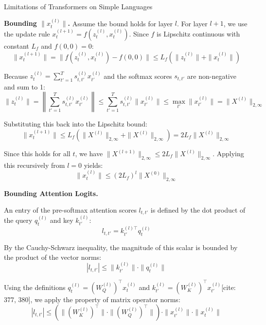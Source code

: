 \begin{question}{Limitations of Transformers on Simple Languages}
\begin{subquestion}{\textbf{Bounding $\|x_{t}^{(l)}\|$.}}
    Assume the bound holds for layer $l$. For layer $l+1$, we use the update rule $x_t^{(l+1)} = f(z_t^{(l)}, x_t^{(l)})$. Since $f$ is Lipschitz continuous with constant $L_f$ and $f(0,0)=0$:
    \begin{equation}
    \|x_t^{(l+1)}\| = \|f(z_t^{(l)}, x_t^{(l)}) - f(0,0)\| \le L_f (\|z_t^{(l)}\| + \|x_t^{(l)}\|)
    \end{equation}

    Because $z_t^{(l)} = \sum_{t'=1}^{T} s_{t,t'}^{(l)} x_{t'}^{(l)}$ and the softmax scores $s_{t,t'}$ are non-negative and sum to 1:
    \begin{equation}
    \|z_t^{(l)}\| = \left\| \sum_{t'=1}^{T} s_{t,t'}^{(l)} x_{t'}^{(l)} \right\| \le \sum_{t'=1}^{T} s_{t,t'}^{(l)} \|x_{t'}^{(l)}\| \le \max_{t'} \|x_{t'}^{(l)}\| = \|X^{(l)}\|_{2,\infty}
    \end{equation}

    Substituting this back into the Lipschitz bound:
    \begin{equation}
    \|x_t^{(l+1)}\| \le L_f (\|X^{(l)}\|_{2,\infty} + \|X^{(l)}\|_{2,\infty}) = 2L_f \|X^{(l)}\|_{2,\infty}
    \end{equation}

    Since this holds for all $t$, we have $\|X^{(l+1)}\|_{2,\infty} \le 2L_f \|X^{(l)}\|_{2,\infty}$. Applying this recursively from $l=0$ yields:
    \begin{equation}
    \|x_t^{(l)}\| \le (2L_f)^l \|X^{(0)}\|_{2,\infty}
    \end{equation}

\end{subquestion}

\begin{subquestion}{\textbf{Bounding Attention Logits.}}

    An entry of the pre-softmax attention scores $l_{t, t'}$ is defined by the dot product of the query $q_t^{(l)}$ and key $k_{t'}^{(l)}$:
    \begin{equation}
    l_{t, t'} = k_{t'}^{(l)\top} q_t^{(l)}
    \end{equation}

    By the Cauchy-Schwarz inequality, the magnitude of this scalar is bounded by the product of the vector norms:
    \begin{equation}
    |l_{t, t'}| \le \|k_{t'}^{(l)}\| \cdot \|q_t^{(l)}\|
    \end{equation}

    Using the definitions $q_t^{(l)} = (W_Q^{(l)})^\top x_t^{(l)}$ and $k_{t'}^{(l)} = (W_K^{(l)})^\top x_{t'}^{(l)}$[cite: 377, 380], we apply the property of matrix operator norms:
    \begin{equation}
    |l_{t, t'}| \le (\|(W_K^{(l)})^\top\| \cdot \|(W_Q^{(l)})^\top\|) \cdot \|x_{t'}^{(l)}\| \cdot \|x_t^{(l)}\|
    \end{equation}


\end{subquestion}
\end{question}
